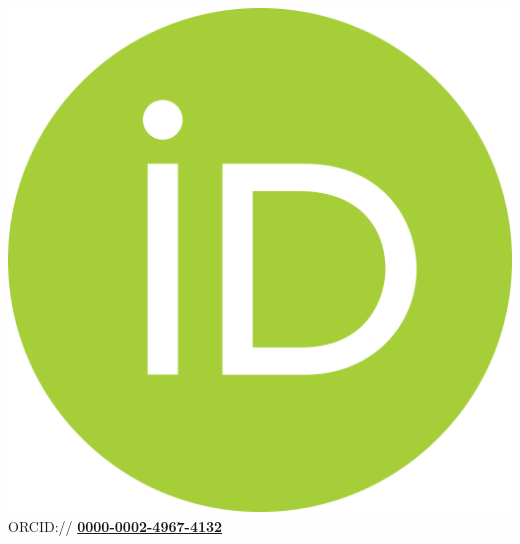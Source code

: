 \documentclass[]{deedy-resume-openfont}
\begin{document}
\begin{minipage}[t]{0.35\textwidth}
\includegraphics[scale=0.01]{images/orcid.png} ORCID:// \href{https://orcid.org/0000-0002-4967-4132}{\bf 0000-0002-4967-4132}


%
%

\end{minipage} 
\hfill
\end{document}

